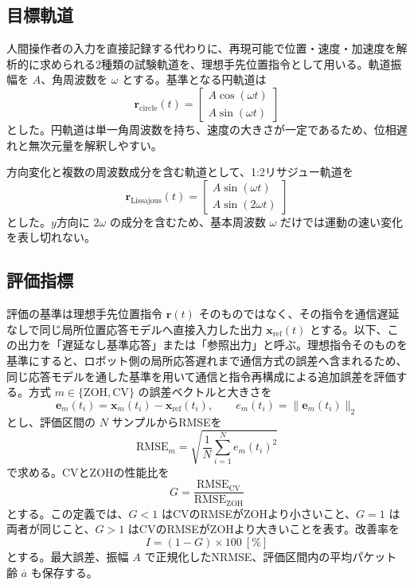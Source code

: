 \documentclass[11pt,a4paper]{article}
\newcommand{\vect}[1]{\bm{#1}}
\newcommand{\RMSE}{\mathrm{RMSE}}
\begin{document}
\subsection{目標軌道}

人間操作者の入力を直接記録する代わりに、再現可能で位置・速度・加速度を解析的に求められる2種類の試験軌道を、理想手先位置指令として用いる。軌道振幅を $A$、角周波数を $\omega$ とする。基準となる円軌道は
\begin{equation}
 \vect r_{\mathrm{circle}}(t)=
 \begin{bmatrix}
 A\cos(\omega t)\\
 A\sin(\omega t)
 \end{bmatrix}
\end{equation}
とした。円軌道は単一角周波数を持ち、速度の大きさが一定であるため、位相遅れと無次元量を解釈しやすい。

方向変化と複数の周波数成分を含む軌道として、1:2リサジュー軌道を
\begin{equation}
 \vect r_{\mathrm{Lissajous}}(t)=
 \begin{bmatrix}
 A\sin(\omega t)\\
 A\sin(2\omega t)
 \end{bmatrix}
\end{equation}
とした。$y$方向に $2\omega$ の成分を含むため、基本周波数 $\omega$ だけでは運動の速い変化を表し切れない。

\subsection{評価指標}

評価の基準は理想手先位置指令 $\vect r(t)$ そのものではなく、その指令を通信遅延なしで同じ局所位置応答モデルへ直接入力した出力 $\vect x_{\mathrm{ref}}(t)$ とする。以下、この出力を「遅延なし基準応答」または「参照出力」と呼ぶ。理想指令そのものを基準にすると、ロボット側の局所応答遅れまで通信方式の誤差へ含まれるため、同じ応答モデルを通した基準を用いて通信と指令再構成による追加誤差を評価する。方式 $m\in\{\mathrm{ZOH},\mathrm{CV}\}$ の誤差ベクトルと大きさを
\begin{equation}
 \vect e_m(t_i)=\vect x_m(t_i)-\vect x_{\mathrm{ref}}(t_i),
 \qquad
 e_m(t_i)=\lVert\vect e_m(t_i)\rVert_2
\end{equation}
とし、評価区間の $N$ サンプルからRMSEを
\begin{equation}
 \RMSE_m=\sqrt{\frac{1}{N}\sum_{i=1}^{N}e_m(t_i)^2}
\end{equation}
で求める。CVとZOHの性能比を
\begin{equation}
 G=\frac{\RMSE_{\mathrm{CV}}}{\RMSE_{\mathrm{ZOH}}}
\end{equation}
とする。この定義では、$G<1$ はCVのRMSEがZOHより小さいこと、$G=1$ は両者が同じこと、$G>1$ はCVのRMSEがZOHより大きいことを表す。改善率を
\begin{equation}
 I=(1-G)\times100\ \mathrm{[\%]}
\end{equation}
とする。最大誤差、振幅 $A$ で正規化したNRMSE、評価区間内の平均パケット齢 $\overline a$ も保存する。
\end{document}
